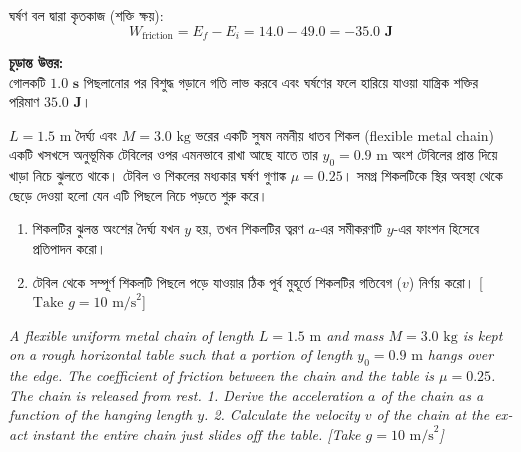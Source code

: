 \documentclass[12pt, a4paper]{article}
\begin{document}
\begin{tcolorbox}[solutionbox={সমাধান (Solution)}]
ঘর্ষণ বল দ্বারা কৃতকাজ (শক্তি ক্ষয়):
$$W_{\text{friction}} = E_f - E_i = 14.0 - 49.0 = \mathbf{-35.0\text{ J}}$$

\vspace{1em}
\begin{tcolorbox}[answerbox]
\textbf{চূড়ান্ত উত্তর:} \\
গোলকটি $\mathbf{1.0\text{ s}}$ পিছলানোর পর বিশুদ্ধ গড়ানে গতি লাভ করবে এবং ঘর্ষণের ফলে হারিয়ে যাওয়া যান্ত্রিক শক্তির পরিমাণ $\mathbf{35.0\text{ J}}$।
\end{tcolorbox}
\end{tcolorbox}

\begin{tcolorbox}[questionbox={প্রশ্ন (Question)19}]
\noindent
$L = 1.5\text{ m}$ দৈর্ঘ্য এবং $M = 3.0\text{ kg}$ ভরের একটি সুষম নমনীয় ধাতব শিকল (flexible metal chain) একটি খসখসে অনুভূমিক টেবিলের ওপর এমনভাবে রাখা আছে যাতে তার $y_0 = 0.9\text{ m}$ অংশ টেবিলের প্রান্ত দিয়ে খাড়া নিচে ঝুলতে থাকে। টেবিল ও শিকলের মধ্যকার ঘর্ষণ গুণাঙ্ক $\mu = 0.25$। সমগ্র শিকলটিকে স্থির অবস্থা থেকে ছেড়ে দেওয়া হলো যেন এটি পিছলে নিচে পড়তে শুরু করে। 

\begin{enumerate}
    \item শিকলটির ঝুলন্ত অংশের দৈর্ঘ্য যখন $y$ হয়, তখন শিকলটির ত্বরণ $a$-এর সমীকরণটি $y$-এর ফাংশন হিসেবে প্রতিপাদন করো। 
    \item টেবিল থেকে সম্পূর্ণ শিকলটি পিছলে পড়ে যাওয়ার ঠিক পূর্ব মুহূর্তে শিকলটির গতিবেগ ($v$) নির্ণয় করো। [$\text{Take } g = 10\text{ m/s}^2$]
\end{enumerate}

\vspace{0.8em}
\begin{english}
\noindent\textit{\color{darkgray}
A flexible uniform metal chain of length $L = 1.5\text{ m}$ and mass $M = 3.0\text{ kg}$ is kept on a rough horizontal table such that a portion of length $y_0 = 0.9\text{ m}$ hangs over the edge. The coefficient of friction between the chain and the table is $\mu = 0.25$. The chain is released from rest. 
1. Derive the acceleration $a$ of the chain as a function of the hanging length $y$. 
2. Calculate the velocity $v$ of the chain at the exact instant the entire chain just slides off the table. [Take $g = 10\text{ m/s}^2$]
}
\end{english}
\end{tcolorbox}
\end{document}
